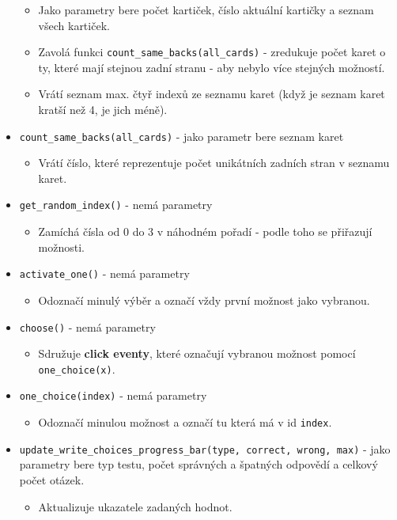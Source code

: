 \documentclass[11pt]{article}
\providecommand{\tightlist}{\setlength{\itemsep}{1pt}\setlength{\parskip}{1pt}}
\let\oldtexttt\texttt
\renewcommand{\texttt}[1]{\oldtexttt{\textcolor{codehighlight}{#1}}}
\begin{document}
\begin{itemize}
  \begin{itemize}
  \tightlist
  \item
    Jako parametry bere počet kartiček, číslo aktuální kartičky a seznam
    všech kartiček.
  \item
    Zavolá funkci \texttt{count\_same\_backs(all\_cards)} - zredukuje
    počet karet o ty, které mají stejnou zadní stranu - aby nebylo více
    stejných možností.
  \item
    Vrátí seznam max. čtyř indexů ze seznamu karet (když je seznam karet
    kratší než 4, je jich méně).
  \end{itemize}
\item
  \texttt{count\_same\_backs(all\_cards)} - jako parametr bere seznam
  karet

  \begin{itemize}
  \tightlist
  \item
    Vrátí číslo, které reprezentuje počet unikátních zadních stran v
    seznamu karet.
  \end{itemize}
\item
  \texttt{get\_random\_index()} - nemá parametry

  \begin{itemize}
  \tightlist
  \item
    Zamíchá čísla od 0 do 3 v náhodném pořadí - podle toho se přiřazují
    možnosti.
  \end{itemize}
\item
  \texttt{activate\_one()} - nemá parametry

  \begin{itemize}
  \tightlist
  \item
    Odoznačí minulý výběr a označí vždy první možnost jako vybranou.
  \end{itemize}
\item
  \texttt{choose()} - nemá parametry

  \begin{itemize}
  \tightlist
  \item
    Sdružuje \textbf{click eventy}, které označují vybranou možnost
    pomocí \texttt{one\_choice(x)}.
  \end{itemize}
\item
  \texttt{one\_choice(index)} - nemá parametry

  \begin{itemize}
  \tightlist
  \item
    Odoznačí minulou možnost a označí tu která má v id \texttt{index}.
  \end{itemize}
\item
  \texttt{update\_write\_choices\_progress\_bar(type,\ correct,\ wrong,\ max)}
  - jako parametry bere typ testu, počet správných a špatných odpovědí a
  celkový počet otázek.

  \begin{itemize}
  \tightlist
  \item
    Aktualizuje ukazatele zadaných hodnot.
  \end{itemize}
\end{itemize}
\end{document}
